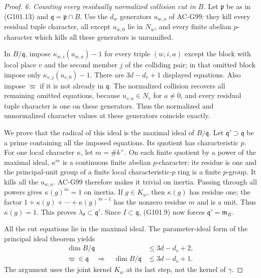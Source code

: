 \begin{proof}
\emph{6. Counting every residually normalized collision cut in \(B\).}
Let \(\mathfrak p\) be as in (G101.13) and
\(\mathfrak q=\mathfrak p\cap B\).
Use the \(d_w\) generators \(u_{w,a}\) of AC-G99:
they kill every residual tuple character, all except
\(u_{w,0}\) lie in \(N_w\), and every finite abelian
\(p\)-character which kills all these generators is unramified.

In \(B/\mathfrak q\), impose
\(\kappa_{w,i}(u_{w,a})-1\) for every triple \((w,i,a)\)
except the block with local place \(v\) and the second member
\(j\) of the colliding pair; in that omitted block impose
only \(\kappa_{v,j}(u_{v,0})-1\).
There are \(3d-d_v+1\) displayed equations.
Also impose \(\varpi\) if it is not already in
\(\mathfrak q\).  The normalized collision recovers all
remaining omitted equations, because \(u_{v,a}\in N_v\)
for \(a\ne0\), and every residual tuple character is one
on these generators.  Thus the normalized and unnormalized
character values at these generators coincide exactly.

We prove that the radical of this ideal is the maximal ideal
of \(B/\mathfrak q\).
Let \(\mathfrak q'\supset\mathfrak q\) be a prime containing
all the imposed equations.
Its quotient has characteristic \(p\).
For one local character \(\kappa\), let \(m=\#k^\times\).
On each finite quotient by a power of the maximal ideal,
\(\kappa^m\) is a continuous finite abelian \(p\)-character:
its residue is one and the principal-unit group of a finite
local characteristic-\(p\) ring is a finite \(p\)-group.
It kills all the \(u_{w,a}\).
AC-G99 therefore makes it trivial on inertia.
Passing through all powers gives
\(\kappa(g)^m=1\) on inertia.
If \(g\in K_w\), then \(\kappa(g)\) has residue one;
the factor
\(1+\kappa(g)+\cdots+\kappa(g)^{m-1}\)
has the nonzero residue \(m\) and is a unit.
Thus \(\kappa(g)=1\).
This proves \(\lambda_\theta\subset\mathfrak q'\).
Since \(I\subset\mathfrak q\), (G101.9) now forces
\(\mathfrak q'=\mathfrak m_B\).

All the cut equations lie in the maximal ideal.
The parameter-ideal form of the principal ideal theorem yields
\[
 \begin{split}
  \dim B/\mathfrak q&\le3d-d_v+2,\\
  \varpi\in\mathfrak q
       \quad\Longrightarrow\quad
  \dim B/\mathfrak q&\le3d-d_v+1.
 \end{split}
 \tag{G101.25}
\]
The argument uses the joint kernel \(K_w\) at its last step,
not the kernel of \(\gamma\).


\end{proof}
